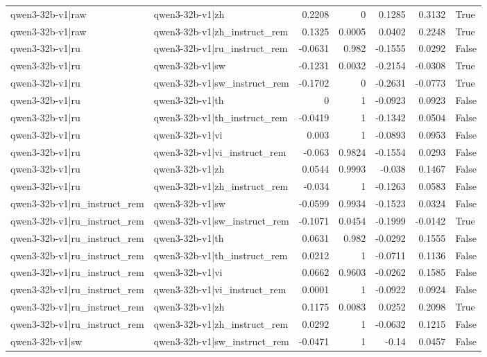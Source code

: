 \begin{table}
\begin{tabular}{l l r r r r l}
qwen3-32b-v1|raw & qwen3-32b-v1|zh & 0.2208 & 0 & 0.1285 & 0.3132 & True \\
qwen3-32b-v1|raw & qwen3-32b-v1|zh_instruct_rem & 0.1325 & 0.0005 & 0.0402 & 0.2248 & True \\
qwen3-32b-v1|ru & qwen3-32b-v1|ru_instruct_rem & -0.0631 & 0.982 & -0.1555 & 0.0292 & False \\
qwen3-32b-v1|ru & qwen3-32b-v1|sw & -0.1231 & 0.0032 & -0.2154 & -0.0308 & True \\
qwen3-32b-v1|ru & qwen3-32b-v1|sw_instruct_rem & -0.1702 & 0 & -0.2631 & -0.0773 & True \\
qwen3-32b-v1|ru & qwen3-32b-v1|th & 0 & 1 & -0.0923 & 0.0923 & False \\
qwen3-32b-v1|ru & qwen3-32b-v1|th_instruct_rem & -0.0419 & 1 & -0.1342 & 0.0504 & False \\
qwen3-32b-v1|ru & qwen3-32b-v1|vi & 0.003 & 1 & -0.0893 & 0.0953 & False \\
qwen3-32b-v1|ru & qwen3-32b-v1|vi_instruct_rem & -0.063 & 0.9824 & -0.1554 & 0.0293 & False \\
qwen3-32b-v1|ru & qwen3-32b-v1|zh & 0.0544 & 0.9993 & -0.038 & 0.1467 & False \\
qwen3-32b-v1|ru & qwen3-32b-v1|zh_instruct_rem & -0.034 & 1 & -0.1263 & 0.0583 & False \\
qwen3-32b-v1|ru_instruct_rem & qwen3-32b-v1|sw & -0.0599 & 0.9934 & -0.1523 & 0.0324 & False \\
qwen3-32b-v1|ru_instruct_rem & qwen3-32b-v1|sw_instruct_rem & -0.1071 & 0.0454 & -0.1999 & -0.0142 & True \\
qwen3-32b-v1|ru_instruct_rem & qwen3-32b-v1|th & 0.0631 & 0.982 & -0.0292 & 0.1555 & False \\
qwen3-32b-v1|ru_instruct_rem & qwen3-32b-v1|th_instruct_rem & 0.0212 & 1 & -0.0711 & 0.1136 & False \\
qwen3-32b-v1|ru_instruct_rem & qwen3-32b-v1|vi & 0.0662 & 0.9603 & -0.0262 & 0.1585 & False \\
qwen3-32b-v1|ru_instruct_rem & qwen3-32b-v1|vi_instruct_rem & 0.0001 & 1 & -0.0922 & 0.0924 & False \\
qwen3-32b-v1|ru_instruct_rem & qwen3-32b-v1|zh & 0.1175 & 0.0083 & 0.0252 & 0.2098 & True \\
qwen3-32b-v1|ru_instruct_rem & qwen3-32b-v1|zh_instruct_rem & 0.0292 & 1 & -0.0632 & 0.1215 & False \\
qwen3-32b-v1|sw & qwen3-32b-v1|sw_instruct_rem & -0.0471 & 1 & -0.14 & 0.0457 & False \\

\end{tabular}
\end{table}
